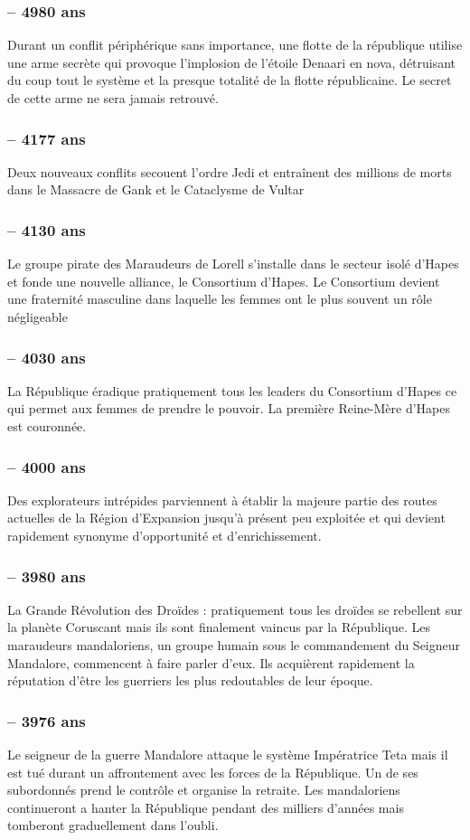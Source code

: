 \documentclass[twoside]{article}
\begin{document}
\subsubsection*{-- 4980 ans}
Durant un conflit périphérique sans importance, une flotte de la république utilise une arme secrète qui provoque l'implosion de l'étoile Denaari en nova, détruisant du coup tout le système et la presque totalité de la flotte républicaine. Le secret de cette arme ne sera jamais retrouvé. 
\subsubsection*{-- 4177 ans} 
Deux nouveaux conflits secouent l'ordre Jedi et entra\^{i}nent des millions de morts dans le Massacre de Gank et le Cataclysme de Vultar 
\subsubsection*{-- 4130 ans} 
Le groupe pirate des Maraudeurs de Lorell s'installe dans le secteur isolé d'Hapes et fonde une nouvelle alliance, le Consortium d'Hapes. Le Consortium devient une fraternité masculine dans laquelle les femmes ont le plus souvent un rôle négligeable 
\subsubsection*{-- 4030 ans} 
La République éradique pratiquement tous les leaders du Consortium d'Hapes ce qui permet aux femmes de prendre le pouvoir. La première Reine-Mère d'Hapes est couronnée. 
\subsubsection*{-- 4000 ans} 
Des explorateurs intrépides parviennent à établir la majeure partie des routes actuelles de la Région d'Expansion jusqu'à présent peu exploitée et qui devient rapidement synonyme d'opportunité et d'enrichissement. 
\subsubsection*{-- 3980 ans} 
La Grande Révolution des Droïdes : pratiquement tous les droïdes se rebellent sur la planète Coruscant mais ils sont finalement vaincus par la République. Les maraudeurs mandaloriens, un groupe humain sous le commandement du Seigneur Mandalore, commencent à faire parler d'eux. Ils acquièrent rapidement la réputation d'être les guerriers les plus redoutables de leur époque.
\subsubsection*{-- 3976 ans} 
Le seigneur de la guerre Mandalore attaque le système Impératrice Teta mais il est tué durant un affrontement avec les forces de la République. Un de ses subordonnés prend le contrôle et organise la retraite. Les mandaloriens continueront a hanter la République pendant des milliers d'années mais tomberont graduellement dans l'oubli. 
\end{document}
